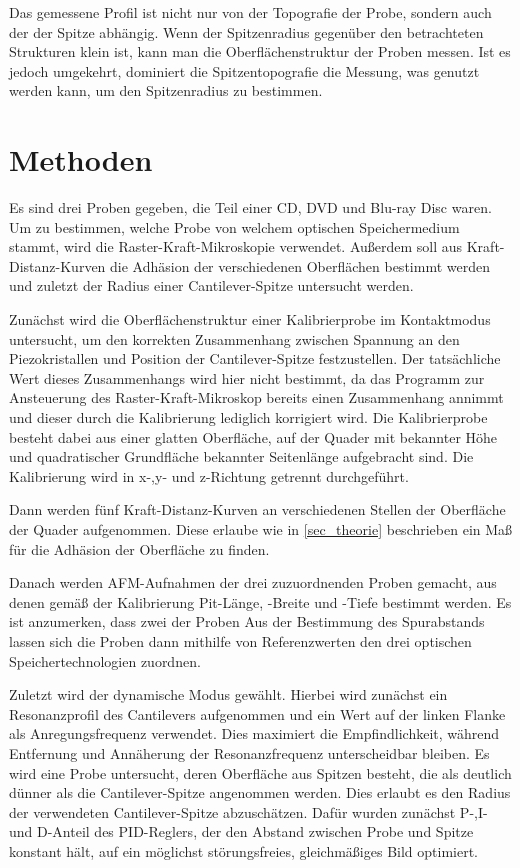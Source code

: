 \documentclass[
	a4paper,
	12pt,
	pagesize,
	ngerman
]{scrartcl}
\begin{document}
	Das gemessene Profil ist nicht nur von der Topografie der Probe, sondern auch der der Spitze abhängig.
	Wenn der Spitzenradius gegenüber den betrachteten Strukturen klein ist, kann man die Oberflächenstruktur der Proben messen.
	Ist es jedoch umgekehrt, dominiert die Spitzentopografie die Messung, was genutzt werden kann, um den Spitzenradius zu bestimmen. %

	\section{Methoden}
	\label{sec_methoden}
	Es sind drei Proben gegeben, die Teil einer CD, DVD und Blu-ray Disc waren.
	Um zu bestimmen, welche Probe von welchem optischen Speichermedium stammt, wird die Raster-Kraft-Mikroskopie verwendet.
	Außerdem soll aus Kraft-Distanz-Kurven die Adhäsion der verschiedenen Oberflächen bestimmt werden und zuletzt der Radius einer Cantilever-Spitze untersucht werden.

	Zunächst wird die Oberflächenstruktur einer Kalibrierprobe im Kontaktmodus untersucht, um den korrekten Zusammenhang zwischen Spannung an den Piezokristallen und Position der Cantilever-Spitze festzustellen.
	Der tatsächliche Wert dieses Zusammenhangs wird hier nicht bestimmt, da das Programm zur Ansteuerung des Raster-Kraft-Mikroskop bereits einen Zusammenhang annimmt und dieser durch die Kalibrierung lediglich korrigiert wird.
	Die Kalibrierprobe besteht dabei aus einer glatten Oberfläche, auf der Quader mit bekannter Höhe und quadratischer Grundfläche bekannter Seitenlänge aufgebracht sind.
	Die Kalibrierung wird in x-,y- und z-Richtung getrennt durchgeführt.

	Dann werden fünf Kraft-Distanz-Kurven an verschiedenen Stellen der Oberfläche der Quader aufgenommen.
	Diese erlaube wie in \cref{sec_theorie} beschrieben ein Maß für die Adhäsion der Oberfläche zu finden.

	Danach werden AFM-Aufnahmen der drei zuzuordnenden Proben gemacht, aus denen gemäß der Kalibrierung Pit-Länge, -Breite und -Tiefe bestimmt werden.
	Es ist anzumerken, dass zwei der Proben
	Aus der Bestimmung des Spurabstands lassen sich die Proben dann mithilfe von Referenzwerten den drei optischen Speichertechnologien zuordnen.

	Zuletzt wird der dynamische Modus gewählt.
	Hierbei wird zunächst ein Resonanzprofil des Cantilevers aufgenommen und ein Wert auf der linken Flanke als Anregungsfrequenz verwendet.
	Dies maximiert die Empfindlichkeit, während Entfernung und Annäherung der Resonanzfrequenz unterscheidbar bleiben.
	Es wird eine Probe untersucht, deren Oberfläche aus Spitzen besteht, die als deutlich dünner als die Cantilever-Spitze angenommen werden.
	Dies erlaubt es den Radius der verwendeten Cantilever-Spitze abzuschätzen.
	Dafür wurden zunächst P-,I- und D-Anteil des PID-Reglers, der den Abstand zwischen Probe und Spitze konstant hält, auf ein möglichst störungsfreies, gleichmäßiges Bild optimiert.
\end{document}
